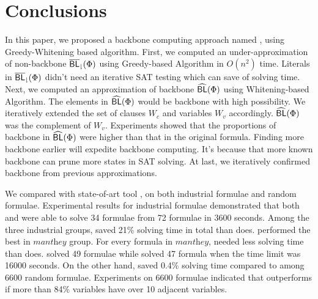 \section{Conclusions}\label{sec:conc}



In this paper, we proposed a backbone computing approach named \tool, using Greedy-Whitening based algorithm.
First, we computed an under-approximation of non-backbone ${\sf \overline{BL}_\downharpoonright}(\Phi)$ using Greedy-based Algorithm in $O(n^2)$ time. Literals in ${\sf \overline{BL}_\downharpoonright}(\Phi)$ didn't need an iterative SAT testing which can save of solving time.
Next, we computed an approximation of backbone ${\sf \widehat{BL}}(\Phi)$ using Whitening-based Algorithm. The elements in ${\sf \widehat{BL}}(\Phi)$  would be backbone with high possibility. We iteratively extended the set of clauses $W_c$ and variables $W_v$ accordingly. ${\sf \widehat{BL}}(\Phi)$ was the complement of $W_v$. Experiments showed that the proportions of backbone in ${\sf \widehat{BL}}(\Phi)$ were higher than that in the original formula. Finding more backbone earlier will expedite backbone computing. It's because that more known backbone can prune more states in SAT solving.
At last, we iteratively confirmed backbone from previous approximations.

We compared \tool with state-of-art tool \minibones, on both industrial formulae and random formulae.
Experimental results for industrial formulae demonstrated that both \tool and \minibones were able to solve 34 formulae from 72 formulae in 3600 seconds. Among the three industrial groups, \tool saved 21\% solving time in total than \minibones does. \tool performed the best in $\textit{manthey}$ group. For every formula in $\textit{manthey}$, \tool needed less solving time than \minibones does.
\tool solved 49 formulae while \minibones solved 47 formula when the time limit was 16000 seconds.
On the other hand, \tool saved 0.4\% solving time compared to \minibones among 6600 random formulae.
Experiments on 6600 formulae indicated that \tool outperforms \minibones if more than 84\% variables have over 10 adjacent variables.

